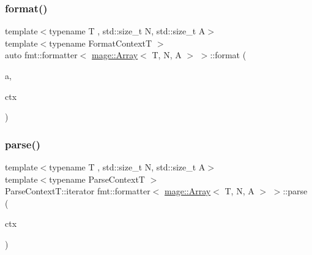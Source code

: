 \subsubsection{\texorpdfstring{format()}{format()}}
{\footnotesize\ttfamily template$<$typename T , std\+::size\+\_\+t N, std\+::size\+\_\+t A$>$ \\
template$<$typename Format\+ContextT $>$ \\
auto fmt\+::formatter$<$ \mbox{\hyperlink{structmage_1_1_array}{mage\+::\+Array}}$<$ T, N, A $>$ $>$\+::format (\begin{DoxyParamCaption}\item[{const \mbox{\hyperlink{structmage_1_1_array}{mage\+::\+Array}}$<$ T, N, A $>$ \&}]{a,  }\item[{Format\+ContextT \&}]{ctx }\end{DoxyParamCaption})}

\mbox{\label{structfmt_1_1formatter_3_01mage_1_1_array_3_01_t_00_01_n_00_01_a_01_4_01_4_a154fdf29b1e99f8ef16e4f02a666e519}} 
\subsubsection{\texorpdfstring{parse()}{parse()}}
{\footnotesize\ttfamily template$<$typename T , std\+::size\+\_\+t N, std\+::size\+\_\+t A$>$ \\
template$<$typename Parse\+ContextT $>$ \\
Parse\+Context\+T\+::iterator fmt\+::formatter$<$ \mbox{\hyperlink{structmage_1_1_array}{mage\+::\+Array}}$<$ T, N, A $>$ $>$\+::parse (\begin{DoxyParamCaption}\item[{Parse\+ContextT \&}]{ctx }\end{DoxyParamCaption})}

